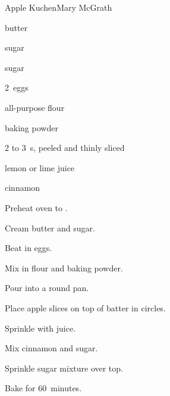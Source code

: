 \begin{recipe}{Apple Kuchen\UNTESTED}{Mary McGrath}{}

\begin{ingredients}
\item \C{\half} butter
\item {} sugar
\item {} sugar
\item 2~eggs
\item {} all-purpose flour
\item {} baking powder
\item 2 to 3~s, peeled and thinly sliced
\item {} lemon or lime juice
\item \tp{\half} cinnamon
\end{ingredients}

\begin{directions}
\item Preheat oven to .
\item Cream butter and  sugar.
\item Beat in eggs.
\item Mix in flour and baking powder.
\item Pour into a  round pan.
\item Place apple slices on top of batter in circles.
\item Sprinkle with juice.
\item Mix cinnamon and  sugar.
\item Sprinkle sugar mixture over top.
\item Bake for 60~minutes.
\end{directions}
\end{recipe}

